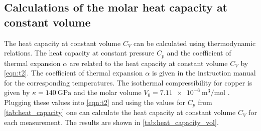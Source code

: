 \subsection{Calculations of the molar heat capacity at constant volume}
\label{sec:heat_capacity_vol}

The heat capacity at constant volume $C_V$ can be calculated using thermodynamic relations. The heat capacity at constant pressure $C_p$ and the coefficient of thermal expansion $\alpha$ are related to the heat capacity at constant volume $C_V$ by \autoref{eqn:t2}.
The coefficient of thermal expansion $\alpha$ is given in the instruction manual \cite{V47} for the corresponding temperatures. The isothermal compressibility for copper is given by $\kappa = \SI{140}{\giga\pascal}$ \cite{isothermal_compressibility} and the molar volume $V_0 = \SI{7.11e-6}{\m\cubed\per\mol}$ \cite{molar_volume_copper}.
Plugging these values into \autoref{eqn:t2} and using the values for $C_p$ from \autoref{tab:heat_capacity} one can calculate the heat capacity at constant volume $C_V$ for each measurement. 
The results are shown in \autoref{tab:heat_capacity_vol}.

